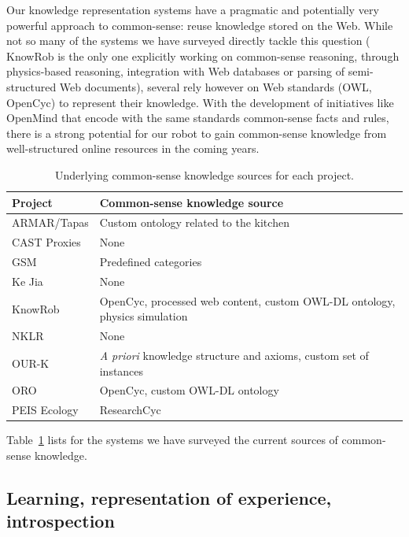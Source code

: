 Our knowledge representation systems have a pragmatic and potentially very
powerful approach to common-sense: reuse knowledge stored on the Web. While not
so many of the systems we have surveyed directly tackle this question ({\sc
KnowRob} is the only one explicitly working on common-sense reasoning, through
physics-based reasoning, integration with Web databases or parsing of
semi-structured Web documents), several rely however on Web standards (OWL,
OpenCyc) to represent their knowledge. With the development of initiatives like
OpenMind that encode with the same standards common-sense facts and rules,
there is a strong potential for our robot to gain common-sense knowledge from
well-structured online resources in the coming years.

\begin{table}
\begin{center}

\begin{tabular}{ll}
\toprule
{\bf Project} & {\bf Common-sense knowledge source} \\
\midrule
ARMAR/{\sc Tapas} & Custom ontology related to the kitchen\\
CAST Proxies &  None \\
GSM &  Predefined categories \\
Ke Jia & None \\
{\sc KnowRob} & {\sc OpenCyc}, processed web content, custom OWL-DL ontology, physics simulation \\
NKLR &  None \\
OUR-K & {\it A priori} knowledge structure and axioms, custom set of instances\\
ORO & {\sc OpenCyc}, custom OWL-DL ontology \\
PEIS Ecology & {\sc ResearchCyc} \\

\bottomrule

\end{tabular}
\end{center}
\caption{Underlying common-sense knowledge sources for each project.}
\label{table|knowledge-sources}
\end{table}

Table~\ref{table|knowledge-sources} lists for the systems we have surveyed the
current sources of common-sense knowledge.

\subsection{Learning, representation of experience, introspection}


